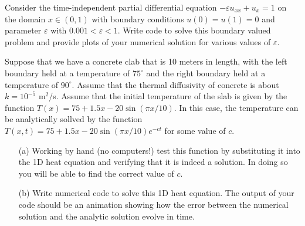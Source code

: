 \begin{problem}
    Consider the time-independent partial differential equation $-\varepsilon u_{xx} +
    u_x = 1$ on the domain $x \in (0,1)$ with boundary conditions $u(0) = u(1) = 0$ and
    parameter $\varepsilon$ with $0.001<\varepsilon<1$.
    Write code to solve this boundary valued problem and provide plots of your numerical
    solution for various values of $\varepsilon$. 
\end{problem}


\begin{problem}
    Suppose that we have a concrete clab that is 10 meters in length, with the left
    boundary held at a temperature of $75^\circ$ and the right boundary held at a
    temperature of $90^\circ$.  Assume that the thermal diffusivity of concrete is about
    $k = 10^{-5}$ m$^2$/s.  Assume that the initial temperature of the slab is given by
    the function $T(x) = 75 + 1.5x - 20 \sin( \pi x / 10)$.  In this case, the temperature
    can be analytically sollved by the function $T(x,t) = 75 + 1.5x - 20 \sin(\pi x / 10)
    e^{-ct}$ for some value of $c$.  
    \begin{enumerate}
        \item[(a)] Working by hand (no computers!) test this function by substituting it
            into the 1D heat equation and verifying that it is indeed a solution.  In
            doing so you will be able to find the correct value of $c$.
        \item[(b)] Write numerical code to solve this 1D heat equation.  The output of
            your code should be an animation showing how the error between the numerical
            solution and the analytic solution evolve in time.
    \end{enumerate}
\end{problem}


